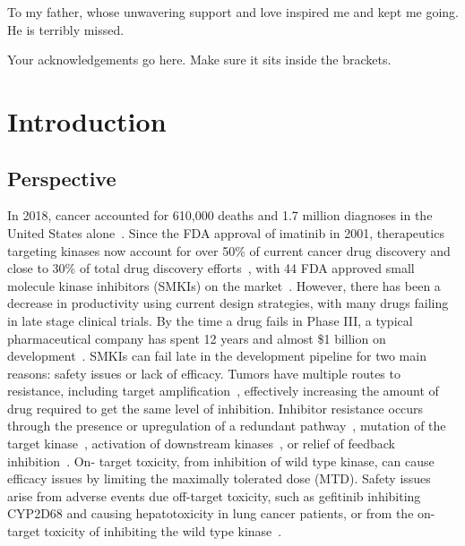 \documentclass[phd,tocprelim]{cornell}
\begin{document}
\begin{dedication}
To my father, whose unwavering support and love inspired me and kept me going. He is terribly missed. 
\end{dedication}

\begin{acknowledgements}
Your acknowledgements go here. Make sure it sits inside the brackets.
\end{acknowledgements}

\contentspage
\tablelistpage
\figurelistpage


\normalspacing \setcounter{page}{1} 
\pagestyle{cornell} \addtolength{\parskip}{0.5\baselineskip}

\chapter{Introduction}

\section{Perspective}
In 2018, cancer accounted for 610,000 deaths and 1.7 million diagnoses in the United States alone~\citep{Siegel:2018cq}. Since the FDA approval of imatinib in 2001, therapeutics targeting kinases now account for over 50\% of current cancer drug discovery and close to 30\% of total drug discovery efforts~\citep{Cohen:2010fs}, with 44 FDA approved small molecule kinase inhibitors (SMKIs) on the market~\citep{fda-approved-kinase-inhibitors}. However, there has been a decrease in productivity using current design strategies, with many drugs failing in late stage clinical trials. By the time a drug fails in Phase III, a typical pharmaceutical company has spent 12 years and almost \$1 billion on development~\citep{Paul:2010ff}. SMKIs can fail late in the development pipeline for two main reasons: safety issues or lack of efficacy. Tumors have multiple routes to resistance, including target amplification~\citep{SanchezVega:2018jg,Bose:2013gl}, effectively increasing the amount of drug required to get the same level of inhibition. Inhibitor resistance occurs through the presence or upregulation of a redundant pathway~\citep{Prahallad:2012iw,Engelman:2007ka}, mutation of the target kinase~\citep{Pao:2005dp,Drilon:2017gb}, activation of downstream kinases~\citep{Knight:Nat.Rev.Cancer:2010}, or relief of feedback inhibition~\citep{Chandarlapaty:CancerCell:2011}. On- target toxicity, from inhibition of wild type kinase, can cause efficacy issues by limiting the maximally tolerated dose (MTD). Safety issues arise from adverse events due off-target toxicity, such as gefitinib inhibiting CYP2D68 and causing hepatotoxicity in lung cancer patients, or from the on-target toxicity of inhibiting the wild type kinase~\citep{Rudmann2013-hi,Liu2014-yi}. 
\end{document}
